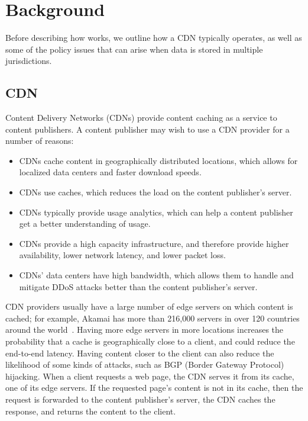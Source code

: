 \section{Background}
\label{sec:background}
Before describing how \system{} works, we outline how a CDN typically operates, as well as some of 
the policy issues that can arise when data is stored in multiple jurisdictions.

\subsection{CDN}
Content Delivery Networks (CDNs) provide content caching as a service to content publishers.  A 
content publisher may wish to use a CDN provider for a number of reasons:

\begin{itemize}
\item CDNs cache content in geographically distributed locations, which allows for localized 
data centers and faster download speeds.
\item CDNs use caches, which reduces the load on the content publisher's server.
\item CDNs typically provide usage analytics, which can help a content publisher get a better 
understanding of usage.
\item CDNs provide a high capacity infrastructure, and therefore provide higher availability, 
lower network latency, and lower packet loss.  
\item CDNs' data centers have high bandwidth, which allows them to handle and mitigate DDoS attacks better 
than the content publisher's server.
\end{itemize}

CDN providers usually have a large number of edge servers on which content is cached; for example, 
Akamai has more than 216,000 servers in over 120 countries around the world~\cite{akamai_facts}.  
Having more edge servers in more locations increases the probability that a cache is geographically 
close to a client, and could reduce the end-to-end latency.  Having content closer to the client can also 
reduce the likelihood of some kinds of attacks, such as BGP (Border Gateway Protocol) hijacking.  When a client requests a web page, 
the CDN serves it from its cache, one of its edge servers.  If the requested page's content is 
not in its cache, then the request is forwarded to the content publisher's server, the CDN 
caches the response, and returns the content to the client. 


